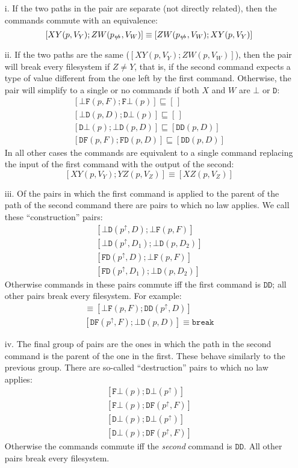 \documentclass[12pt]{article}
\newcommand{\empt}{\bot}
\newcommand{\pp}{p^\uparrow} %
\newcommand{\np}{p_{\centernot\leftrightarrow}} %
\newcommand{\cbrk}{\mathtt{break}}
\newcommand{\fscommand}[2]{{#1#2}}
\newcommand{\fsregcommandchar}[1]{\mathtt{#1}}
\newcommand{\fsregcommand}[2]{\fscommand{\fsregcommandchar{#1}}{\fsregcommandchar{#2}}}
\newcommand{\cbf}{\fsregcommand{\empt}{F}}
\newcommand{\cbd}{\fsregcommand{\empt}{D}}
\newcommand{\cfb}{\fsregcommand{F}{\empt}}
\newcommand{\cfd}{\fsregcommand{F}{D}}
\newcommand{\cdb}{\fsregcommand{D}{\empt}}
\newcommand{\cdf}{\fsregcommand{D}{F}}
\newcommand{\cdd}{\fsregcommand{D}{D}}
\newcommand{\cxy}{\fscommand{X}{Y}}
\newcommand{\cyz}{\fscommand{Y}{Z}}
\newcommand{\cxz}{\fscommand{X}{Z}}
\newcommand{\czw}{\fscommand{Z}{W}}
\newcommand{\eqext}{\sqsubseteq}
\newcommand{\emptyseq}{[\,]}
\begin{document}
\begin{itemize}
\item[i.] If the two paths in the pair are separate (not directly related), then
the commands commute with an equivalence:
\[ [\cxy(p,V_Y); \czw(\np,V_W)] \equiv [\czw(\np,V_W); \cxy(p,V_Y)] \]
%
\item[ii.] If the two paths are the same ($[\cxy(p,V_Y); \czw(p,V_W)]$), then
the pair will break every filesystem if $Z\ne Y$, that is, if the second
command expects a type of value different from the one left by the first command.
Otherwise, the pair will simplify to a single or no commands
if both $X$ and $W$ are $\fsregcommandchar{\empt}$ or $\fsregcommandchar{D}$:
\begin{gather*}
           [\cbf(p, F); \cfb(p)] \eqext \emptyseq \\
           [\cbd(p, D); \cdb(p)] \eqext \emptyseq \\
           [\cdb(p); \cbd(p, D)] \eqext [\cdd(p, D)] \\
           [\cdf(p, F); \cfd(p, D)] \eqext [\cdd(p, D)]
\end{gather*}
In all other cases the commands are equivalent to a single command
replacing the input of the first command with the output of the second:
\[ [\cxy(p, V_Y); \cyz(p, V_Z)] \equiv [\cxz(p, V_Z)] \]
%
\item[iii.]
Of the pairs in which the first command is applied to the parent of the path
of the second command there are pairs to which no law applies.
We call these ``construction'' pairs:
\begin{gather*}
           [\cbd(\pp, D); \cbf(p, F)] \\
           [\cbd(\pp, D_1); \cbd(p, D_2)] \\
           [\cfd(\pp, D); \cbf(p, F)] \\
           [\cfd(\pp, D_1); \cbd(p, D_2)]
\end{gather*}
Otherwise commands in these pairs commute iff the first command is $\cdd$;
all other pairs break every filesystem. For example:
\begin{gather*}
[\cdd(\pp, D); \cbf(p, F)] \equiv [\cbf(p, F); \cdd(\pp, D)] \\
[\cdf(\pp, F); \cbd(p, D)] \equiv \cbrk
\end{gather*}
%
\item[iv.]
The final group of pairs are the ones in which the path in the second
command is the parent of the one in the first.
These behave similarly to the previous group. There are
so-called ``destruction'' pairs to which no law applies:
\begin{gather*}
           [\cfb(p); \cdb(\pp)] \\
           [\cfb(p); \cdf(\pp, F)] \\
           [\cdb(p); \cdb(\pp)] \\
           [\cdb(p); \cdf(\pp, F)]
\end{gather*}
Otherwise the commands commute iff the \emph{second} command is $\cdd$.
All other pairs break every filesystem.
\end{itemize}
\end{document}
